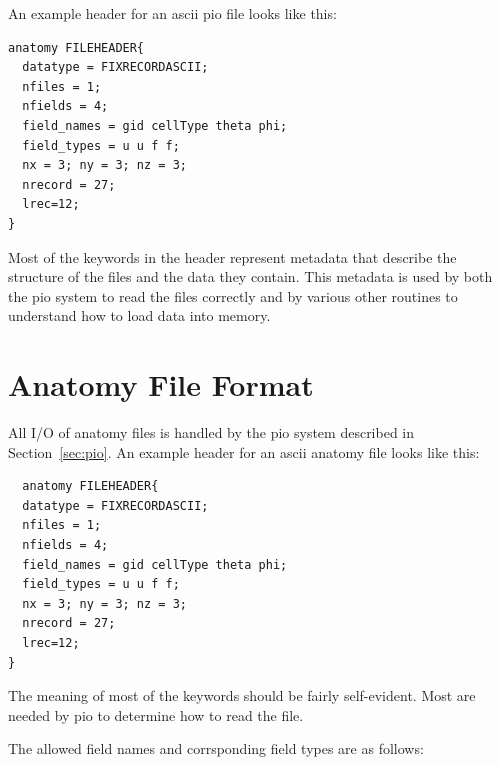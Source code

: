 \documentclass{article}
\begin{document}
An example header for an ascii pio file looks like this:
\begin{verbatim}
anatomy FILEHEADER{
  datatype = FIXRECORDASCII;
  nfiles = 1;
  nfields = 4;
  field_names = gid cellType theta phi;
  field_types = u u f f;
  nx = 3; ny = 3; nz = 3;
  nrecord = 27;
  lrec=12;
}
\end{verbatim}

Most of the  keywords in the header represent metadata that describe the
structure of the files and the data they contain.  This metadata is used
by both the pio system to read the files correctly and by various other
routines to understand how to load data into memory.




\section{Anatomy File Format}
\label{sec:AnatomyFormat}

All I/O of anatomy files is handled by the pio system described in
Section~\ref{sec:pio}.  
An example header for an ascii anatomy file looks like this:
\begin{verbatim}
  anatomy FILEHEADER{
  datatype = FIXRECORDASCII;
  nfiles = 1;
  nfields = 4;
  field_names = gid cellType theta phi;
  field_types = u u f f;
  nx = 3; ny = 3; nz = 3;
  nrecord = 27;
  lrec=12;
}
\end{verbatim}

The meaning of most of the keywords should be fairly self-evident.
  Most are needed by pio to determine
how to read the file.  


\bigskip
The allowed field names and corrsponding field types are as follows:
\end{document}
